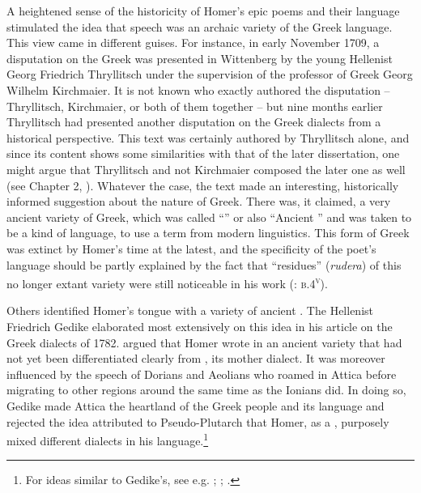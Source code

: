 A heightened sense of the historicity of Homer’s epic poems and their language stimulated the idea that  speech was an archaic variety of the Greek language. This view came in different guises. For instance, in early November 1709, a disputation on the Greek  was presented in Wittenberg by the young Hellenist Georg Friedrich Thryllitsch under the supervision of the professor of Greek Georg Wilhelm Kirchmaier. It is not known who exactly authored the disputation – Thryllitsch, Kirchmaier, or both of them together – but nine months earlier Thryllitsch had presented another disputation on the Greek dialects from a historical perspective. This text was certainly authored by Thryllitsch alone, and since its content shows some similarities with that of the later dissertation, one might argue that Thryllitsch and not Kirchmaier composed the later one as well (see Chapter 2, ). Whatever the case, the text made an interesting, historically informed suggestion about the nature of  Greek. There was, it claimed, a very ancient variety of Greek, which was called “” or also “Ancient ” and was taken to be a kind of  language, to use a term from modern linguistics. This form of Greek was extinct by Homer’s time at the latest, and the specificity of the poet’s language should be partly explained by the fact that “residues” (\textit{rudera}) of this no longer extant  variety were still noticeable in his work (\citealt{Kirchmaier1709}: \textsc{b.4}\textsc{\textsuperscript{v}}).

Others identified Homer’s tongue with a variety of ancient . The  Hellenist Friedrich Gedike elaborated most extensively on this idea in his article on the Greek dialects of 1782. \citet[22--23]{Gedike1782} argued that Homer wrote in an ancient  variety that had not yet been differentiated clearly from , its mother dialect. It was moreover influenced by the speech of Dorians and Aeolians who roamed in Attica before migrating to other regions around the same time as the Ionians did. In doing so, Gedike made Attica the heartland of the Greek people and its language and rejected the idea attributed to Pseudo-Plutarch that Homer, as a , purposely mixed different dialects in his language.\footnote{For ideas similar to Gedike’s, see e.g. \citet[115--116]{Freret1809}; \citet[202]{Beattie1778}; \citet[175--176]{Trendelenburg1782}.}

